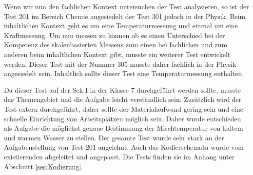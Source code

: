 Wenn wir nun den fachlichen Kontext untersuchen der Test analysieren, so ist der Test 201 im Bereich Chemie angesiedelt der Test 301 jedoch in der Physik. Beim inhaltlichen Kontext geht es um eine Temperaturmessung und einmal um eine Kraftmessung. Um nun messen zu können ob es einen Unterschied bei der Kompetenz des skalenbasierten Messens zum einen bei fachlichen und zum anderen beim inhaltlichen Kontext gibt, musste ein weiterer Test entwickelt werden. Dieser Test mit der Nummer 305 musste daher fachlich in der Physik angesiedelt sein. Inhaltlich sollte dieser Test eine Temperaturmessung enthalten.

Da dieser Test auf der Sek I in der Klasse 7 durchgeführt werden sollte, musste das Themengebiet und die Aufgabe leicht verständlich sein. Zusätzlich wird der Test extern durchgeführt, daher sollte der Materialaufwand gering sein und eine schnelle Einrichtung von Arbeitsplätzen möglich sein. Daher wurde entschieden als Aufgabe die möglichst genaue Bestimmung der Mischtemperatur von kaltem und warmen Wasser zu stellen. Der gesamte Test wurde sehr stark an der Aufgabenstellung von Test 201 angelehnt. Auch das Kodierschemata wurde vom existierenden abgeleitet und angepasst. Die Tests finden sie im Anhang unter Abschnitt \ref{sec:Kodierung}.

